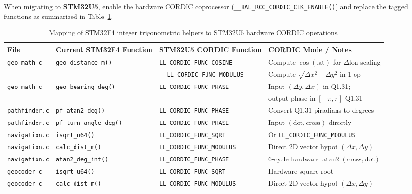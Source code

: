 \documentclass[11pt,a4paper]{article}
\begin{document}
When migrating to \textbf{STM32U5}, enable the hardware CORDIC coprocessor (\texttt{\_\_HAL\_RCC\_CORDIC\_CLK\_ENABLE()}) and replace the tagged functions as summarized in Table~\ref{tab:cordic}.

\begin{table}[h!]
\centering
\small
\begin{tabular}{@{}llll@{}}
\toprule
\textbf{File} & \textbf{Current STM32F4 Function} & \textbf{STM32U5 CORDIC Function} & \textbf{CORDIC Mode / Notes} \\
\midrule
\texttt{geo\_math.c} & \texttt{geo\_distance\_m()} & \texttt{LL\_CORDIC\_FUNC\_COSINE} & Compute $\cos(\text{lat})$ for $\Delta\text{lon}$ scaling \\
 & & + \texttt{LL\_CORDIC\_FUNC\_MODULUS} & Compute $\sqrt{\Delta x^2 + \Delta y^2}$ in 1 op \\
\addlinespace
\texttt{geo\_math.c} & \texttt{geo\_bearing\_deg()} & \texttt{LL\_CORDIC\_FUNC\_PHASE} & Input $(\Delta y, \Delta x)$ in Q1.31; \\
 & & & output phase in $[-\pi, \pi]$ Q1.31 \\
\addlinespace
\texttt{pathfinder.c} & \texttt{pf\_atan2\_deg()} & \texttt{LL\_CORDIC\_FUNC\_PHASE} & Convert Q1.31 piradians to degrees \\
\texttt{pathfinder.c} & \texttt{pf\_turn\_angle\_deg()} & \texttt{LL\_CORDIC\_FUNC\_PHASE} & Input $(\text{dot}, \text{cross})$ directly \\
\addlinespace
\texttt{navigation.c} & \texttt{isqrt\_u64()} & \texttt{LL\_CORDIC\_FUNC\_SQRT} & Or \texttt{LL\_CORDIC\_FUNC\_MODULUS} \\
\texttt{navigation.c} & \texttt{calc\_dist\_m()} & \texttt{LL\_CORDIC\_FUNC\_MODULUS} & Direct 2D vector hypot $(\Delta x, \Delta y)$ \\
\texttt{navigation.c} & \texttt{atan2\_deg\_int()} & \texttt{LL\_CORDIC\_FUNC\_PHASE} & 6-cycle hardware $\operatorname{atan2}(\text{cross}, \text{dot})$ \\
\addlinespace
\texttt{geocoder.c} & \texttt{isqrt\_u64()} & \texttt{LL\_CORDIC\_FUNC\_SQRT} & Hardware square root \\
\texttt{geocoder.c} & \texttt{calc\_dist\_m()} & \texttt{LL\_CORDIC\_FUNC\_MODULUS} & Direct 2D vector hypot $(\Delta x, \Delta y)$ \\
\bottomrule
\end{tabular}
\caption{Mapping of STM32F4 integer trigonometric helpers to STM32U5 hardware CORDIC operations.}
\label{tab:cordic}
\end{table}
\end{document}
